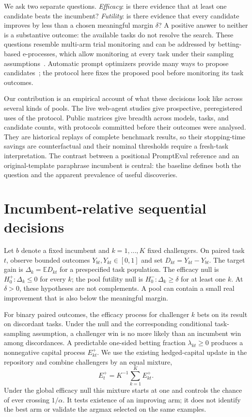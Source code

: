 \documentclass[11pt]{article}
\begin{document}
We ask two separate questions. \emph{Efficacy}: is there evidence that at least one candidate beats the incumbent? \emph{Futility}: is there evidence that every candidate improves by less than a chosen meaningful margin $\delta$? A positive answer to neither is a substantive outcome: the available tasks do not resolve the search. These questions resemble multi-arm trial monitoring and can be addressed by betting-based e-processes, which allow monitoring at every task under their sampling assumptions~\citep{waudbysmith2024betting,ramdas2023gametheoretic}. Automatic prompt optimizers provide many ways to propose candidates~\citep{zhou2023ape,yang2024opro,agrawal2025gepa}; the protocol here fixes the proposed pool before monitoring its task outcomes.

Our contribution is an empirical account of what these decisions look like across several kinds of pools. The live web-agent studies give prospective, preregistered uses of the protocol. Public matrices give breadth across models, tasks, and candidate counts, with protocols committed before their outcomes were analysed. They are historical replays of complete benchmark results, so their stopping-time savings are counterfactual and their nominal thresholds require a fresh-task interpretation. The contrast between a positional PromptEval reference and an original-template paraphrase incumbent is central: the baseline defines both the question and the apparent prevalence of useful discoveries.

\section{Incumbent-relative sequential decisions}
\label{sec:method}
Let $b$ denote a fixed incumbent and $k=1,\ldots,K$ fixed challengers. On paired task $t$, observe bounded outcomes $Y_{bt},Y_{kt}\in[0,1]$ and set $D_{kt}=Y_{kt}-Y_{bt}$. The target gain is $\Delta_k=\mathbb{E}D_{kt}$ for a prespecified task population. The efficacy null is $H^+_0:\Delta_k\leq0$ for every $k$; the pool futility null is $H^-_0:\Delta_k\geq\delta$ for at least one $k$. At $\delta>0$, these hypotheses are not complements. A pool can contain a small real improvement that is also below the meaningful margin.

For binary paired outcomes, the efficacy process for challenger $k$ bets on its result on discordant tasks. Under the null and the corresponding conditional task-sampling assumption, a challenger win is no more likely than an incumbent win among discordances. A predictable one-sided betting fraction $\lambda_{kt}\geq0$ produces a nonnegative capital process $E^+_{kt}$. We use the existing hedged-capital update in the repository and combine challengers by an equal mixture,
\begin{equation}
 E^+_t=K^{-1}\sum_{k=1}^K E^+_{kt}.
\end{equation}
Under the global efficacy null this mixture starts at one and controls the chance of ever crossing $1/\alpha$. It tests existence of an improving arm; it does not identify the best arm or validate the argmax selected on the same examples.
\end{document}
